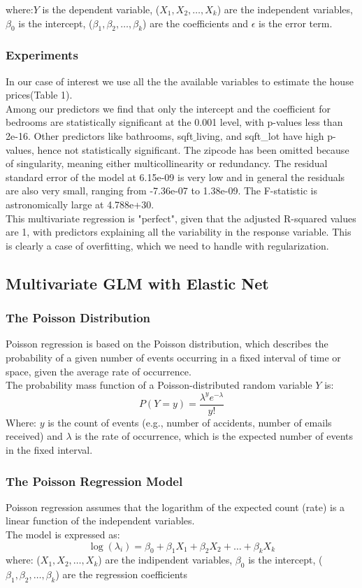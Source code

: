 \documentclass[a4paper, 8pt]{article}
\begin{document}
\begin{multicols}{2}
where:$Y$ is the dependent variable, ($X_1, X_2,\dots,X_k$) are the independent variables, $\beta_0$ is the intercept, ($\beta_1,\beta_2, \dots, \beta_k$) are the coefficients and $\epsilon$ is the error term.\\
\subsubsection{Experiments}
In our case of interest we use all the the available variables to estimate the house prices(Table 1).\\
Among our predictors we find that only the intercept and the coefficient for bedrooms are statistically significant at the 0.001 level, with p-values less than 2e-16. Other predictors like bathrooms, sqft$\_$living, and sqft{\_}lot have high p-values, hence not statistically significant. The zipcode has been omitted because of singularity, meaning either multicollinearity or redundancy. The residual standard error of the model at 6.15e-09 is very low and in general the residuals are also very small, ranging from -7.36e-07 to 1.38e-09. The F-statistic is astronomically large at 4.788e+30.\\
This multivariate regression is "perfect", given that the adjusted R-squared values are 1, with predictors explaining all the variability in the response variable. This is clearly a case of overfitting, which we need to handle with regularization.


\subsection{Multivariate GLM with Elastic Net}
\subsubsection{The Poisson Distribution}
Poisson regression is based on the Poisson distribution, which describes the probability of a given number of events occurring in a fixed interval of time or space, given the average rate of occurrence.\\
The probability mass function of a Poisson-distributed random variable $Y$ is:
\begin{equation}
P(Y=y)= \frac{\lambda^ye^{-\lambda}}{y!}
\end{equation}
Where: $y$ is the count of events (e.g., number of accidents, number of emails received) and $\lambda$ is the rate of occurrence, which is the expected number of events in the fixed interval.
\subsubsection{The Poisson Regression Model}
Poisson regression assumes that the logarithm of the expected count (rate) is a linear function of the independent variables.\\
The model is expressed as:
\begin{equation}
\log(\lambda_i)=\beta_0+\beta_1X_1+\beta_2X_2+\dots+\beta_kX_k
\end{equation}
where: ($X_1, X_2,\dots,X_k$) are the indipendent variables, $\beta_0$ is the intercept, ($\beta_1,\beta_2, \dots, \beta_k$) are the regression coefficients

\end{multicols}
\end{document}
